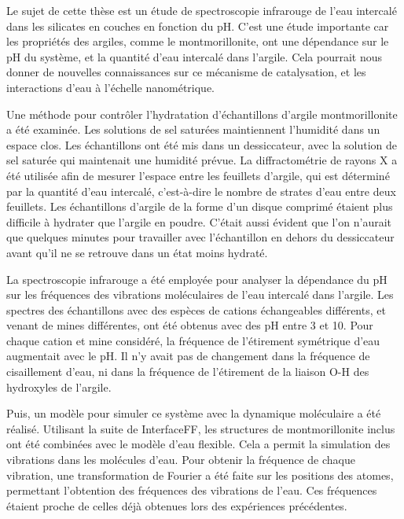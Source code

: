  
 
Le sujet de cette thèse est un étude de spectroscopie infrarouge de l’eau intercalé dans les silicates en couches en fonction du pH. C’est une étude importante car les propriétés des argiles, comme le montmorillonite, ont une dépendance sur le pH du système, et la quantité d’eau intercalé dans l’argile. Cela pourrait nous donner de nouvelles connaissances sur ce mécanisme de catalysation, et les interactions d’eau à l’échelle nanométrique.

Une méthode pour contrôler l'hydratation d’échantillons d’argile montmorillonite a été examinée. Les solutions de sel saturées maintiennent l'humidité dans un espace clos. Les échantillons ont été mis dans un dessiccateur, avec la solution de sel saturée qui maintenait une humidité prévue. La diffractométrie de rayons X a été utilisée afin de mesurer l’espace entre les feuillets d’argile, qui est déterminé par la quantité d’eau intercalé, c’est-à-dire le nombre de strates d’eau entre deux feuillets. Les échantillons d’argile de la forme d’un disque comprimé étaient plus difficile à hydrater que l’argile en poudre. C’était aussi évident que l’on n’aurait que quelques minutes pour travailler avec l’échantillon en dehors du dessiccateur avant qu’il ne se retrouve dans un état moins hydraté.

La spectroscopie infrarouge a été employée pour analyser la dépendance du pH sur les fréquences des vibrations moléculaires de l’eau intercalé dans l’argile. Les spectres des échantillons avec des espèces de cations échangeables différents, et venant de mines différentes, ont été obtenus avec des pH entre 3 et 10. Pour chaque cation et mine considéré, la fréquence de l’étirement symétrique d’eau augmentait avec le pH. Il n’y avait pas de changement dans la fréquence de cisaillement d’eau, ni dans la fréquence de l’étirement de la liaison O-H des hydroxyles de l’argile.

Puis, un modèle pour simuler ce système avec la dynamique moléculaire a été réalisé. Utilisant la suite de InterfaceFF, les structures de montmorillonite inclus ont été combinées avec le modèle d’eau flexible. Cela a permit la simulation des vibrations dans les molécules d’eau. Pour obtenir la fréquence de chaque vibration, une transformation de Fourier a été faite sur les positions des atomes, permettant l'obtention des fréquences des vibrations de l’eau. Ces fréquences étaient proche de celles déjà obtenues lors des expériences précédentes.

 
